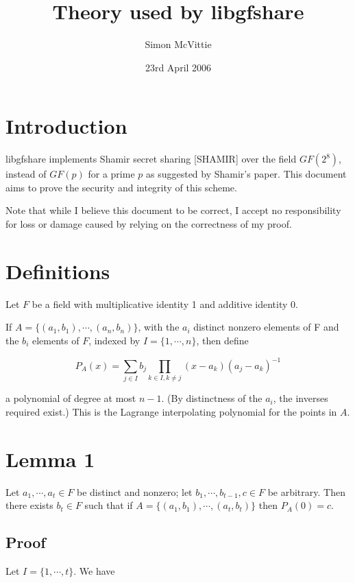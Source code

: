 \documentclass[]{article}
\begin{document}
\title{Theory used by libgfshare}
\author{Simon McVittie}
\date{23rd April 2006}
\maketitle

\section{Introduction}

libgfshare implements Shamir secret sharing [SHAMIR] over the field $GF(2^8)$,
instead of $GF(p)$ for a prime $p$ as suggested by Shamir's paper.
This document aims to prove the security and integrity of this scheme.

Note that while I believe this document to be correct, I accept no
responsibility for loss or damage caused by relying on the correctness
of my proof.

\section{Definitions}

Let $F$ be a field with multiplicative identity 1 and additive identity 0.

If $A = \{(a_1, b_1), \cdots, (a_n, b_n)\}$, with the $a_i$ distinct nonzero
elements of F and the $b_i$ elements of $F$, indexed by $I = \{1,\cdots,n\}$,
then define

\[
        P_A(x) = \sum_{j\in I} {b_j \prod_{k\in I, k\neq j} {(x-a_k)(a_j-a_k)^{-1}}}
\]

a polynomial of degree at most $n-1$. (By distinctness of the $a_i$, the
inverses required exist.) This is the Lagrange interpolating polynomial
for the points in $A$.

\section{Lemma 1}

Let $a_1,\cdots,a_t\in F$ be distinct and nonzero; let
$b_1,\cdots,b_{t-1},c\in F$ be arbitrary. Then there exists $b_t\in F$
such that if $A = \{(a_1, b_1), \cdots, (a_t, b_t)\}$ then $P_A(0) = c$.

\subsection{Proof}

Let $I = \{1, \cdots, t\}$. We have
\end{document}
